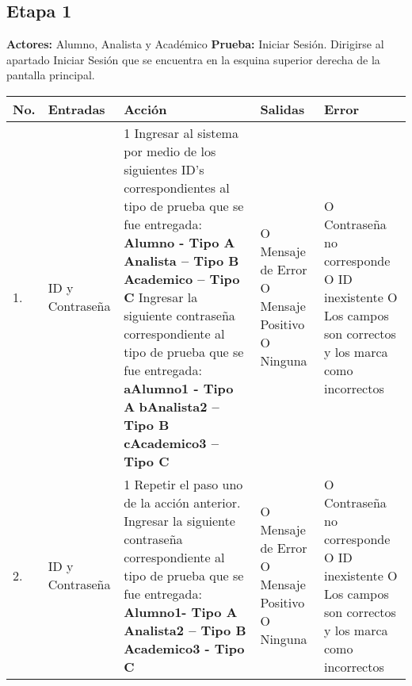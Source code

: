 \subsection*{Etapa 1}
\textbf{Actores:} Alumno, Analista y Académico\newline
\textbf{Prueba:} Iniciar Sesión.
Dirigirse al apartado Iniciar Sesión que se encuentra en la esquina superior derecha de la pantalla principal.
\begin{longtable}{|p{0.7cm}|p{3cm}|p{6cm}|p{2.3cm}|p{3cm}|}
    \hline	
	\textbf{No.}
	&
	\textbf{Entradas}	
	&
	\textbf{Acción}
	&
	\textbf{Salidas}
	&
	\textbf{Error}
	\\
	\hline
	1.
	&
	ID y Contraseña
	&
	1 Ingresar al sistema por medio de los siguientes ID’s correspondientes al tipo de prueba que se fue entregada:\newline
	\textbf{Alumno - Tipo A}\newline
	\textbf{Analista – Tipo B}\newline 
	\textbf{Academico – Tipo C}\newline
	2 Ingresar la siguiente contraseña correspondiente al tipo de prueba que se fue entregada:\newline
	\textbf{aAlumno1 - Tipo A}\newline
	\textbf{bAnalista2 – Tipo B}\newline
	\textbf{cAcademico3 – Tipo C}\newline
	& 	
	O Mensaje de Error\newline
	O Mensaje Positivo\newline
	O Ninguna
	&
	O Contraseña no corresponde\newline
	O ID inexistente\newline
	O Los campos son correctos y los marca como incorrectos\\
	\hline
	2. 
	&
	ID y Contraseña
	&
	1 Repetir el paso uno de la acción anterior.\newline
	2 Ingresar la siguiente contraseña correspondiente al tipo de prueba que se fue entregada:\newline
	\textbf{Alumno1- Tipo A}\newline
	\textbf{Analista2 – Tipo B}\newline
	\textbf{Academico3 -  Tipo C}\newline
	& 	
	O Mensaje de Error\newline
	O Mensaje Positivo\newline
	O Ninguna
	&
	O Contraseña no corresponde
	O ID inexistente 
	O Los campos son correctos y los marca como incorrectos\\
	\hline
\end{longtable}
